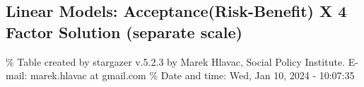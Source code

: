 \documentclass[
]{article}
\begin{document}
\newpage

\hypertarget{linear-models-acceptancerisk-benefit-x-4-factor-solution-separate-scale}{%
\subsection{Linear Models: Acceptance(Risk-Benefit) X 4 Factor Solution
(separate
scale)}\label{linear-models-acceptancerisk-benefit-x-4-factor-solution-separate-scale}}

\begingroup\setlength{\tabcolsep}{1pt}

\renewcommand{\arraystretch}{0.7}

\% Table created by stargazer v.5.2.3 by Marek Hlavac, Social Policy
Institute. E-mail: marek.hlavac at gmail.com \% Date and time: Wed, Jan
10, 2024 - 10:07:35
\end{document}
